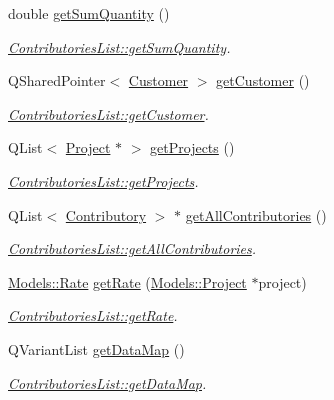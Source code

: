 \begin{DoxyCompactItemize}
double \hyperlink{classModels_1_1ContributoriesList_af9b3b1b703cebeef552d058999ffcc4c}{get\-Sum\-Quantity} ()
\begin{DoxyCompactList}\small\item\em \hyperlink{classModels_1_1ContributoriesList_af9b3b1b703cebeef552d058999ffcc4c}{Contributories\-List\-::get\-Sum\-Quantity}. \end{DoxyCompactList}\item 
Q\-Shared\-Pointer$<$ \hyperlink{classModels_1_1Customer}{Customer} $>$ \hyperlink{classModels_1_1ContributoriesList_a760097b1c0d7822cfd3d4796d553fae9}{get\-Customer} ()
\begin{DoxyCompactList}\small\item\em \hyperlink{classModels_1_1ContributoriesList_a760097b1c0d7822cfd3d4796d553fae9}{Contributories\-List\-::get\-Customer}. \end{DoxyCompactList}\item 
Q\-List$<$ \hyperlink{classModels_1_1Project}{Project} $\ast$ $>$ \hyperlink{classModels_1_1ContributoriesList_a4d52a35870cd9257ee3b5db75bd8ff25}{get\-Projects} ()
\begin{DoxyCompactList}\small\item\em \hyperlink{classModels_1_1ContributoriesList_a4d52a35870cd9257ee3b5db75bd8ff25}{Contributories\-List\-::get\-Projects}. \end{DoxyCompactList}\item 
Q\-List$<$ \hyperlink{classModels_1_1Contributory}{Contributory} $>$ $\ast$ \hyperlink{classModels_1_1ContributoriesList_a629a25a7958dba28ec37c8a3709cdf2f}{get\-All\-Contributories} ()
\begin{DoxyCompactList}\small\item\em \hyperlink{classModels_1_1ContributoriesList_a629a25a7958dba28ec37c8a3709cdf2f}{Contributories\-List\-::get\-All\-Contributories}. \end{DoxyCompactList}\item 
\hyperlink{classModels_1_1Rate}{Models\-::\-Rate} \hyperlink{classModels_1_1ContributoriesList_a16118d05867f3e2550f44796400253b9}{get\-Rate} (\hyperlink{classModels_1_1Project}{Models\-::\-Project} $\ast$project)
\begin{DoxyCompactList}\small\item\em \hyperlink{classModels_1_1ContributoriesList_a16118d05867f3e2550f44796400253b9}{Contributories\-List\-::get\-Rate}. \end{DoxyCompactList}\item 
Q\-Variant\-List \hyperlink{classModels_1_1ContributoriesList_af063322348b0f02d0c7159bd7413a836}{get\-Data\-Map} ()
\begin{DoxyCompactList}\small\item\em \hyperlink{classModels_1_1ContributoriesList_af063322348b0f02d0c7159bd7413a836}{Contributories\-List\-::get\-Data\-Map}. \end{DoxyCompactList}\end{DoxyCompactItemize}


